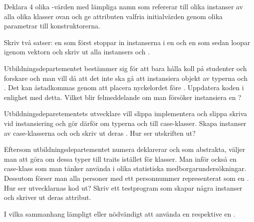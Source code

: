 \Subtask Deklara 4 olika -värden med lämpliga namn som refererar till olika instanser av alla olika klasser ovan och ge attributen valfria initialvärden genom olika parametrar till konstruktorerna.

\Subtask Skriv två satser: en som först stoppar in instanserna i en  och en som sedan loopar igenom vektorn och skriv ut alla instansers  och . 


\Subtask Utbildningsdepartementet bestämmer sig för att bara hålla koll på studenter och forskare och man vill då att det inte ska gå att instansiera objekt av typerna  och . Det kan åstadkommas genom att placera nyckelordet  före . Uppdatera koden i enlighet med detta. Vilket blir felmeddelande om man försöker instansiera en ?

\Subtask Utbildningsdeparetementets utvecklare vill slippa implementera  och slippa skriva  vid instansiering och gör därför om typerna  och  till case-klasser. Skapa instanser av case-klasserna  och  och skriv ut deras . Hur ser utskriften ut?

\Subtask Eftersom utbildningsdepartementet numera deklarerar  och  som abstrakta, väljer man att göra om dessa typer till traits istället för klasser. Man inför också en case-klass  som man tänker använda i olika statistiska medborgarundersökningar. Dessutom förser man alla personer med ett personnummer representerat som en . Hur ser utvecklarnas kod ut? Skriv ett testprogram som skapar några instanser och skriver ut deras attribut. 

\Subtask\Pen I vilka sammanhang lämpligt eller nödvändigt att använda en  respektive en .




